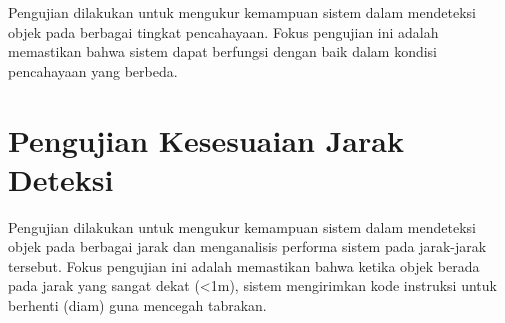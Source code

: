 Pengujian dilakukan untuk mengukur kemampuan sistem dalam mendeteksi objek pada berbagai tingkat pencahayaan. Fokus pengujian ini adalah memastikan bahwa sistem dapat berfungsi dengan baik dalam kondisi pencahayaan yang berbeda.

\newpage
\section{Pengujian Kesesuaian Jarak Deteksi}
\label{sec:pengujiankesesuaianjarakdeteksi}

Pengujian dilakukan untuk mengukur kemampuan sistem dalam mendeteksi objek pada berbagai jarak dan menganalisis performa sistem pada jarak-jarak tersebut. Fokus pengujian ini adalah memastikan bahwa ketika objek berada pada jarak yang sangat dekat (\textless 1m), sistem mengirimkan kode instruksi untuk berhenti (diam) guna mencegah tabrakan.

